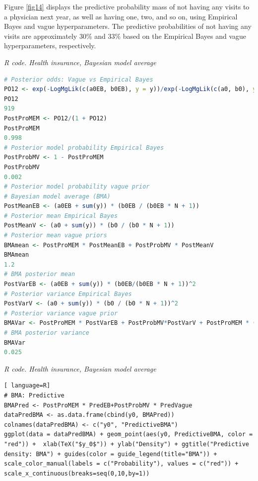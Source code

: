 Figure \ref{fig14} displays the predictive probability mass of not having any visits to a physician next year, as well as having one, two, and so on, using Empirical Bayes and vague hyperparameters. The predictive probabilities of not having any visits are approximately 30\% and 33\% based on the Empirical Bayes and vague hyperparameters, respectively.

\begin{tcolorbox}[enhanced,width=4.67in,center upper,
	fontupper=\large\bfseries,drop shadow southwest,sharp corners]
\textit{R code. Health insurance, Bayesian model average}
\begin{VF}
\begin{lstlisting}[language=R]
# Posterior odds: Vague vs Empirical Bayes
PO12 <- exp(-LogMgLik(c(a0EB, b0EB), y = y))/exp(-LogMgLik(c(a0, b0), y = y))
PO12
919
PostProMEM <- PO12/(1 + PO12) 
PostProMEM
0.998
# Posterior model probability Empirical Bayes
PostProbMV <- 1 - PostProMEM 
PostProbMV
0.002
# Posterior model probability vague prior
# Bayesian model average (BMA)
PostMeanEB <- (a0EB + sum(y)) * (b0EB / (b0EB * N + 1)) 
# Posterior mean Empirical Bayes 
PostMeanV <- (a0 + sum(y)) * (b0 / (b0 * N + 1)) 
# Posterior mean vague priors
BMAmean <- PostProMEM * PostMeanEB + PostProbMV * PostMeanV  
BMAmean
1.2
# BMA posterior mean
PostVarEB <- (a0EB + sum(y)) * (b0EB/(b0EB * N + 1))^2 
# Posterior variance Empirical Bayes
PostVarV <- (a0 + sum(y)) * (b0 / (b0 * N + 1))^2 
# Posterior variance vague prior 
BMAVar <- PostProMEM * PostVarEB + PostProbMV*PostVarV + PostProMEM * (PostMeanEB - BMAmean)^2 + PostProbMV * (PostMeanV - BMAmean)^2
# BMA posterior variance   
BMAVar
0.025    
\end{lstlisting}
\end{VF}
\end{tcolorbox}

\begin{tcolorbox}[enhanced,width=4.67in,center upper,
	fontupper=\large\bfseries,drop shadow southwest,sharp corners]
	\textit{R code. Health insurance, Bayesian model average}
	\begin{VF}
		\begin{lstlisting}[ language=R]
# BMA: Predictive
BMAPred <- PostProMEM * PredEB+PostProbMV * PredVague
dataPredBMA <- as.data.frame(cbind(y0, BMAPred))
colnames(dataPredBMA) <- c("y0", "PredictiveBMA")
ggplot(data = dataPredBMA) + geom_point(aes(y0, PredictiveBMA, color = "red")) +  xlab(TeX("$y_0$")) + ylab("Density") + ggtitle("Predictive density: BMA") + guides(color = guide_legend(title="BMA")) + scale_color_manual(labels = c("Probability"), values = c("red")) + scale_x_continuous(breaks=seq(0,10,by=1)) 
		\end{lstlisting}
	\end{VF}
\end{tcolorbox}

